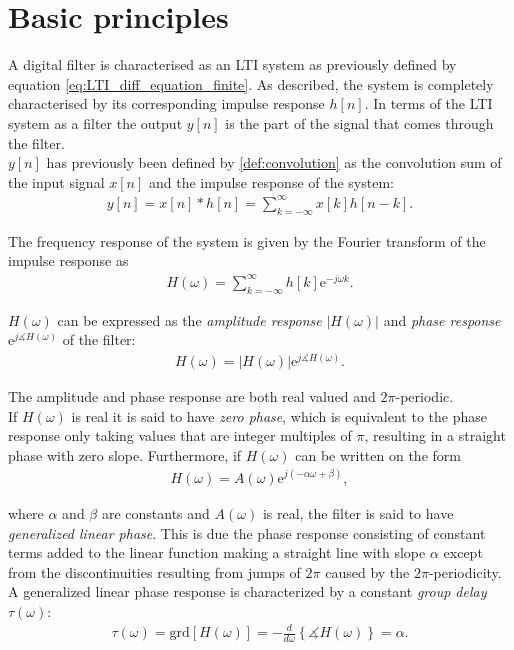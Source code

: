 \section{Basic principles} \label{sec:basic_filter}
A digital filter is characterised as an LTI system as previously defined by equation \eqref{eq:LTI_diff_equation_finite}. As described, the system is completely characterised by its corresponding impulse response $h[n]$. In terms of the LTI system as a filter the output $y[n]$ is the part of the signal that comes through the filter. \\
$y[n]$ has previously been defined by \eqref{def:convolution} as the convolution sum of the input signal $x[n]$ and the impulse response of the system:
\begin{align*}
y[n] = x[n]*h[n] = \sum_{k=-\infty}^{\infty} x[k]h[n-k].
\end{align*}

The frequency response of the system is given by the Fourier transform of the impulse response as
\begin{align} \label{eq:freq_res}
H(\omega) = \sum_{k=-\infty}^{\infty} h[k] \text{e}^{-j\omega k}.
\end{align}

$H(\omega)$ can be expressed as the \textit{amplitude response} $|H(\omega)|$ and \textit{phase response} $\text{e}^{j\measuredangle H(\omega)}$ of the filter:
\begin{align*}
H(\omega) = |H(\omega)| \text{e}^{j\measuredangle H(\omega)}.
\end{align*}

The amplitude and phase response are both real valued and $2\pi$-periodic.\\
If $H(\omega)$ is real it is said to have \textit{zero phase}, which is equivalent to the phase response only taking values that are integer multiples of $\pi$, resulting in a straight phase with zero slope. Furthermore, if $H(\omega)$ can be written on the form
\begin{align} \label{eq:lin_pha}
H(\omega) = A(\omega) \text{e}^{j(-\alpha\omega + \beta)},
\end{align}

where $\alpha$ and $\beta$ are constants and $A(\omega)$ is real, the filter is said to have \textit{generalized linear phase}. This is due the phase response consisting of constant terms added to the linear function making a straight line with slope $\alpha$ except from the discontinuities resulting from jumps of $2\pi$ caused by the $2\pi$-periodicity. \\
A generalized linear phase response is characterized by a constant \textit{group delay} $\tau(\omega)$:
\begin{align*}
\tau(\omega) = \text{grd}[H(\omega)] = -\frac{d}{d\omega} \left\{ \measuredangle H(\omega) \right\} = \alpha.
\end{align*}

